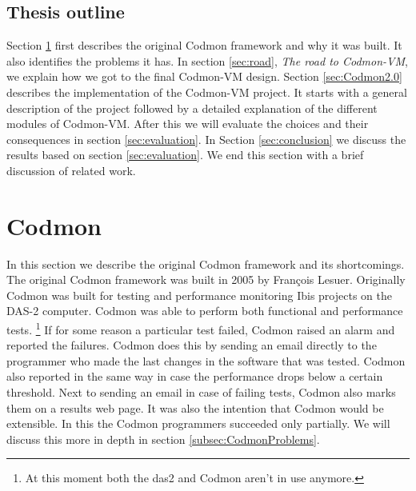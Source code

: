 \documentclass{article}
\newcommand{\project}{Codmon-VM}
\begin{document}
\subsection{Thesis outline}
\label{subsec:Thesisoutline}
Section \ref{sec:codmon} first describes the original Codmon framework and why it was built. It also identifies the problems it has. In section \ref{sec:road}, \emph{The road to \project{}}, 
we explain how we got to the final \project{} design. Section \ref{sec:Codmon2.0} describes the implementation of the \project{} project. 
It starts with a general description of the project followed by a detailed explanation of the different modules of \project{}. After this we will evaluate the choices and their consequences 
in section \ref{sec:evaluation}. In Section \ref{sec:conclusion} we discuss the results based on section \ref{sec:evaluation}. We end this section with a brief discussion of related work.

\newpage
\section{Codmon}
\label{sec:codmon}
In this section we describe the original Codmon framework and its shortcomings. The original Codmon framework was built in 2005 by François Lesuer\cite{Codmon}. Originally Codmon was built for 
testing and performance monitoring Ibis projects\cite{Ibis}\cite{Satin}\cite{MPJ}\cite{IPL}\cite{GMI} on the DAS-2\cite{das2} computer. Codmon was able to perform both functional and performance tests. 
\footnote{At this moment both the das2 and Codmon aren't in use anymore.} If for some reason a particular test failed, Codmon raised an alarm and reported the failures. Codmon does this by 
sending an email directly to the programmer who made the last changes in the software that was tested. Codmon also reported in the same way in case the performance drops below a certain threshold. 
Next to sending an email in case of failing tests, Codmon also marks them on a results web page. It was also the intention that Codmon would be extensible. In this the Codmon programmers 
succeeded only partially. We will discuss this more in depth in section \ref{subsec:CodmonProblems}.  
\end{document}

